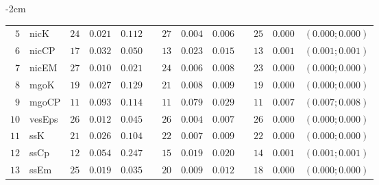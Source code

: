 \begin{table*}[!htbp]
\begin{adjustwidth*}{}{-2cm}
\begin{tabular}{@{}rlrrrrrrrrrcc@{}}
\footnotesize{$5 $} & \footnotesize{nicK     } & \footnotesize{$24$} & \footnotesize{$0.021$} & \footnotesize{$0.112$} && \footnotesize{$27$} & \footnotesize{$0.004$} & \footnotesize{$0.006$} && \footnotesize{$25$} & \footnotesize{$0.000$} & \footnotesize{$(0.000;0.000)$} \\
\footnotesize{$6 $} & \footnotesize{nicCP    } & \footnotesize{$17$} & \footnotesize{$0.032$} & \footnotesize{$0.050$} && \footnotesize{$13$} & \footnotesize{$0.023$} & \footnotesize{$0.015$} && \footnotesize{$13$} & \footnotesize{$0.001$} & \footnotesize{$(0.001;0.001)$} \\
\footnotesize{$7 $} & \footnotesize{nicEM    } & \footnotesize{$27$} & \footnotesize{$0.010$} & \footnotesize{$0.021$} && \footnotesize{$24$} & \footnotesize{$0.006$} & \footnotesize{$0.008$} && \footnotesize{$23$} & \footnotesize{$0.000$} & \footnotesize{$(0.000;0.000)$} \\
\footnotesize{$8 $} & \footnotesize{mgoK     } & \footnotesize{$19$} & \footnotesize{$0.027$} & \footnotesize{$0.129$} && \footnotesize{$21$} & \footnotesize{$0.008$} & \footnotesize{$0.009$} && \footnotesize{$19$} & \footnotesize{$0.000$} & \footnotesize{$(0.000;0.000)$} \\
\footnotesize{$9 $} & \footnotesize{mgoCP    } & \footnotesize{$11$} & \footnotesize{$0.093$} & \footnotesize{$0.114$} && \footnotesize{$11$} & \footnotesize{$0.079$} & \footnotesize{$0.029$} && \footnotesize{$11$} & \footnotesize{$0.007$} & \footnotesize{$(0.007;0.008)$} \\
\footnotesize{$10$} & \footnotesize{vesEps   } & \footnotesize{$26$} & \footnotesize{$0.012$} & \footnotesize{$0.045$} && \footnotesize{$26$} & \footnotesize{$0.004$} & \footnotesize{$0.007$} && \footnotesize{$26$} & \footnotesize{$0.000$} & \footnotesize{$(0.000;0.000)$} \\
\footnotesize{$11$} & \footnotesize{ssK      } & \footnotesize{$21$} & \footnotesize{$0.026$} & \footnotesize{$0.104$} && \footnotesize{$22$} & \footnotesize{$0.007$} & \footnotesize{$0.009$} && \footnotesize{$22$} & \footnotesize{$0.000$} & \footnotesize{$(0.000;0.000)$} \\
\footnotesize{$12$} & \footnotesize{ssCp     } & \footnotesize{$12$} & \footnotesize{$0.054$} & \footnotesize{$0.247$} && \footnotesize{$15$} & \footnotesize{$0.019$} & \footnotesize{$0.020$} && \footnotesize{$14$} & \footnotesize{$0.001$} & \footnotesize{$(0.001;0.001)$} \\
\footnotesize{$13$} & \footnotesize{ssEm     } & \footnotesize{$25$} & \footnotesize{$0.019$} & \footnotesize{$0.035$} && \footnotesize{$20$} & \footnotesize{$0.009$} & \footnotesize{$0.012$} && \footnotesize{$18$} & \footnotesize{$0.000$} & \footnotesize{$(0.000;0.000)$} \\

\end{tabular}
\end{adjustwidth*}
\end{table*}
